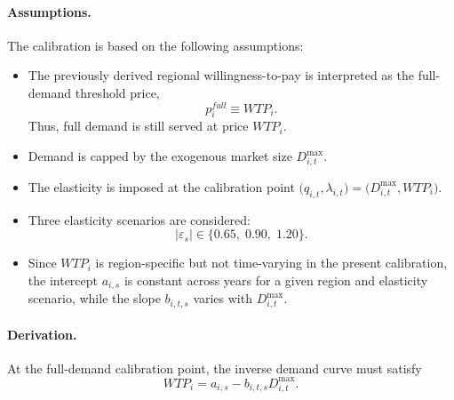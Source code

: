 \documentclass[11pt,a4paper]{article}
\begin{document}
\paragraph{Assumptions.}
The calibration is based on the following assumptions:
\begin{itemize}
    \item The previously derived regional willingness-to-pay is interpreted as the full-demand threshold price,
    \begin{equation}
    p_i^{full} \equiv WTP_i.
    \end{equation}
    Thus, full demand is still served at price \(WTP_i\).
    
    \item Demand is capped by the exogenous market size \(D^{\max}_{i,t}\).
    
    \item The elasticity is imposed at the calibration point \(\bigl(q_{i,t},\lambda_{i,t}\bigr)=\bigl(D^{\max}_{i,t},WTP_i\bigr)\).
    
    \item Three elasticity scenarios are considered:
    \begin{equation}
    |\varepsilon_s| \in \{0.65,\;0.90,\;1.20\}.
    \end{equation}
    
    \item Since \(WTP_i\) is region-specific but not time-varying in the present calibration, the intercept \(a_{i,s}\) is constant across years for a given region and elasticity scenario, while the slope \(b_{i,t,s}\) varies with \(D^{\max}_{i,t}\).
\end{itemize}

\paragraph{Derivation.}
At the full-demand calibration point, the inverse demand curve must satisfy
\begin{equation}
WTP_i = a_{i,s} - b_{i,t,s}D^{\max}_{i,t}.
\label{eq:full_demand_condition}
\end{equation}
\end{document}
